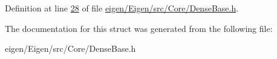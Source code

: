 Definition at line \hyperlink{eigen_2_eigen_2src_2_core_2_dense_base_8h_source_l00028}{28} of file \hyperlink{eigen_2_eigen_2src_2_core_2_dense_base_8h_source}{eigen/\+Eigen/src/\+Core/\+Dense\+Base.\+h}.



The documentation for this struct was generated from the following file\+:\begin{DoxyCompactItemize}
\item 
eigen/\+Eigen/src/\+Core/\+Dense\+Base.\+h\end{DoxyCompactItemize}

